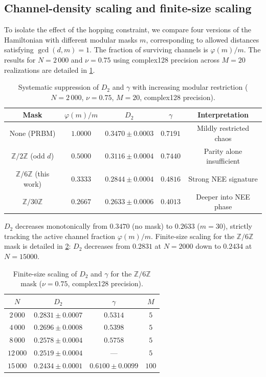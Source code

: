 \documentclass[11pt,a4paper]{article}
\newcommand{\Zmod}{\mathbb{Z}/6\mathbb{Z}}
\begin{document}
\subsection{Channel-density scaling and finite-size scaling}
\label{sec:channel_density_scaling}

To isolate the effect of the hopping constraint, we compare four versions
of the Hamiltonian with different modular masks $m$, corresponding to
allowed distances satisfying $\gcd(d,m)=1$. The fraction of surviving
channels is $\varphi(m)/m$. The results for $N=2\,000$ and $\nu=0.75$
using complex128 precision across $M=20$ realizations are detailed in
\cref{tab:mask_comparison}.

\begin{table}[htbp]
\centering
\caption{Systematic suppression of $D_2$ and $\gamma$ with increasing
modular restriction ($N=2\,000$, $\nu=0.75$, $M=20$, complex128 precision).}
\label{tab:mask_comparison}
\begin{tabular}{c c c c c}
\toprule
\textbf{Mask} & $\varphi(m)/m$ & $D_2$ & $\gamma$ & \textbf{Interpretation} \\
\midrule
None (PRBM)     & $1.0000$ & $0.3470 \pm 0.0003$ & $0.7191$ & Mildly restricted chaos \\
$\mathbb{Z}/2\mathbb{Z}$ (odd $d$) & $0.5000$ & $0.3116 \pm 0.0004$ & $0.7440$ & Parity alone insufficient \\
$\Zmod$ (this work) & $0.3333$ & $0.2844 \pm 0.0004$ & $0.4816$ & Strong NEE signature \\
$\mathbb{Z}/30\mathbb{Z}$ & $0.2667$ & $0.2633 \pm 0.0006$ & $0.4013$ & Deeper into NEE phase \\
\bottomrule
\end{tabular}
\end{table}

$D_2$ decreases monotonically from $0.3470$ (no mask) to $0.2633$ ($m=30$),
strictly tracking the active channel fraction $\varphi(m)/m$. Finite-size
scaling for the $\Zmod$ mask is detailed in \cref{tab:scaling}: $D_2$
decreases from $0.2831$ at $N=2000$ down to $0.2434$ at $N=15000$.

\begin{table}[htbp]
\centering
\caption{Finite-size scaling of $D_2$ and $\gamma$ for the $\Zmod$ mask
($\nu=0.75$, complex128 precision).}
\label{tab:scaling}
\begin{tabular}{c c c c}
\toprule
$N$ & $D_2$ & $\gamma$ & $M$ \\
\midrule
$2\,000$  & $0.2831 \pm 0.0007$ & $0.5314$ & $5$ \\
$4\,000$  & $0.2696 \pm 0.0008$ & $0.5398$ & $5$ \\
$8\,000$  & $0.2578 \pm 0.0004$ & $0.5758$ & $5$ \\
$12\,000$ & $0.2519 \pm 0.0004$ & --- & $5$ \\
$15\,000$ & $0.2434 \pm 0.0001$ & $0.6100 \pm 0.0099$ & $100$ \\
\bottomrule
\end{tabular}
\end{table}
\end{document}

